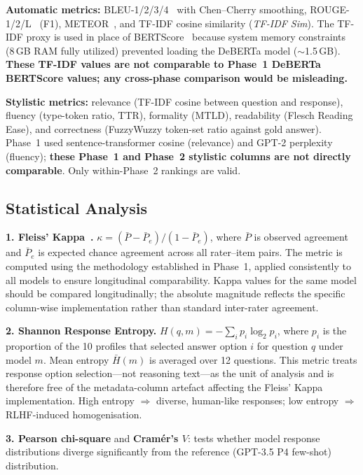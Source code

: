 \documentclass[12pt,a4paper]{article}
\begin{document}
\textbf{Automatic metrics:}
BLEU-1/2/3/4~\cite{papineni2002} with Chen--Cherry smoothing,
ROUGE-1/2/L~\cite{lin2004} (F1), METEOR~\cite{banerjee2005},
and TF-IDF cosine similarity (\textit{TF-IDF Sim}).
The TF-IDF proxy is used in place of BERTScore~\cite{zhang2019}
because system memory constraints (8\,GB RAM fully utilized) prevented
loading the DeBERTa model ($\sim$1.5\,GB).
\textbf{These TF-IDF values are not comparable to Phase~1 DeBERTa
BERTScore values; any cross-phase comparison would be misleading.}

\textbf{Stylistic metrics:}
relevance (TF-IDF cosine between question and response),
fluency (type-token ratio, TTR),
formality (MTLD),
readability (Flesch Reading Ease),
and correctness (FuzzyWuzzy token-set ratio against gold answer).
Phase~1 used sentence-transformer cosine (relevance) and GPT-2
perplexity (fluency); \textbf{these Phase~1 and Phase~2 stylistic
columns are not directly comparable}. Only within-Phase~2 rankings
are valid.

\subsection{Statistical Analysis}
\label{sec:method:stats}

\textbf{1. Fleiss' Kappa~\cite{fleiss1971}.}
$\kappa = (\bar{P} - \bar{P}_e)/(1 - \bar{P}_e)$,
where $\bar{P}$ is observed agreement and $\bar{P}_e$ is expected
chance agreement across all rater--item pairs.
The metric is computed using the methodology established in Phase~1,
applied consistently to all models to ensure longitudinal comparability.
Kappa values for the same model should be compared longitudinally;
the absolute magnitude reflects the specific column-wise implementation
rather than standard inter-rater agreement.

\textbf{2. Shannon Response Entropy.}
$H(q, m) = -\sum_i p_i \log_2 p_i$,
where $p_i$ is the proportion of the 10 profiles that selected
answer option $i$ for question $q$ under model $m$.
Mean entropy $\bar{H}(m)$ is averaged over 12 questions.
This metric treats response option selection---not reasoning text---as
the unit of analysis and is therefore free of the metadata-column
artefact affecting the Fleiss' Kappa implementation.
High entropy $\Rightarrow$ diverse, human-like responses;
low entropy $\Rightarrow$ RLHF-induced homogenisation.

\textbf{3. Pearson chi-square} and \textbf{Cram\'er's $V$}:
tests whether model response distributions diverge significantly
from the reference (GPT-3.5 P4 few-shot) distribution.
\end{document}
